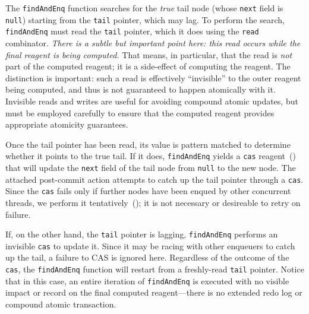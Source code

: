 \documentclass[preprint,nocopyrightspace]{sigplanconf}
\begin{document}
The \lstinline{findAndEnq} function searches for the \emph{true} tail node
(whose \lstinline{next} field is \lstinline{null}) starting from the
\lstinline{tail} pointer, which may lag.  To perform the search,
\lstinline{findAndEnq} must read the \lstinline{tail} pointer, which it does
using the \lstinline{read} combinator.  \emph{There is a subtle but important
  point here: this read occurs while the final reagent is being computed.}  That
means, in particular, that the read is \emph{not} part of the computed reagent;
it is a side-effect of computing the reagent.  The distinction is important:
such a read is effectively ``invisible'' to the outer reagent being computed,
and thus is not guaranteed to happen atomically with it.  Invisible reads and
writes are useful for avoiding compound atomic updates, but must be employed
carefully to ensure that the computed reagent provides appropriate atomicity
guarantees.  %

Once the tail pointer has been read, its value is pattern matched to determine
whether it points to the true tail.  If it does, \lstinline{findAndEnq} yields a
\lstinline{cas} reagent~() that will update the
\lstinline{next} field of the tail node from \lstinline{null} to the new node.
The attached post-commit action attempts to catch up the tail pointer through a
\lstinline{cas}.  Since the \lstinline{cas} fails only if further nodes have
been enqued by other concurrent threads, we perform it
tentatively~(); it is not necessary or desireable to retry on
failure.

If, on the other hand, the \lstinline{tail} pointer is lagging,
\lstinline{findAndEnq} performs an invisible \lstinline{cas} to update it.
Since it may be racing with other enqueuers to catch up the tail, a failure to
CAS is ignored here.  Regardless of the outcome of the \lstinline{cas}, the
\lstinline{findAndEnq} function will restart from a freshly-read
\lstinline{tail} pointer.  Notice that in this case, an entire iteration of
\lstinline{findAndEnq} is executed with no visible impact or record on the final
computed reagent---there is no extended redo log or compound atomic transaction.


\end{document}
